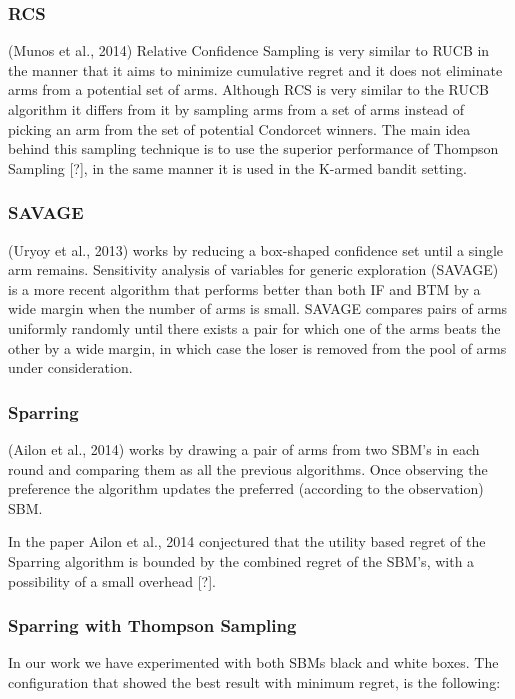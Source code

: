 \documentclass{llncs}
\begin{document}
	
	\newpage
\subsubsection{RCS}
	(Munos et al., 2014) Relative Confidence Sampling is very similar to RUCB in the manner that it aims to minimize cumulative regret and it does not eliminate arms from a potential set of arms.
	Although RCS is very similar to the RUCB algorithm it differs from it by sampling arms from a set of arms instead of picking an arm from the set of potential Condorcet winners.  
	The main idea behind this sampling technique is to use the superior performance of Thompson Sampling [?], in the same manner it is used in the K-armed bandit setting. 

	
	\newpage
\subsubsection{SAVAGE}
	(Uryoy et al., 2013) works by reducing a box-shaped confidence set until a single arm remains.
	Sensitivity analysis of variables for generic exploration (SAVAGE) is a more recent algorithm that performs better than both IF and BTM by a wide margin when the number of arms is small. 
	SAVAGE compares pairs of arms uniformly randomly until there exists a pair for which one of the arms beats the other by a wide margin, in which case the loser is removed from the pool of arms under consideration.


\subsubsection{Sparring}
	(Ailon et al., 2014) works by drawing a pair of arms from two SBM's in each round and comparing them as all the previous algorithms. Once observing the preference the algorithm updates the preferred (according to the observation) SBM.  
	
		
	\begin{conjecture}
 		In the paper Ailon et al., 2014 conjectured that the utility based regret of the Sparring algorithm is bounded by the combined regret of the SBM's, with a possibility of a small overhead [?].
 	\end{conjecture}		
		
	\subsubsection{Sparring with Thompson Sampling}
		In our work  we have experimented with both SBMs black and white boxes. The configuration that showed the best result with minimum regret, is the following: 
		
		
\end{document}
